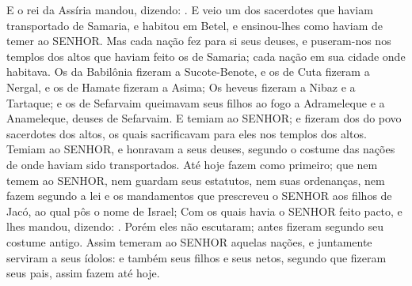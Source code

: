 {  E o rei da Assíria mandou, dizendo: .
  E veio um dos sacerdotes que haviam transportado de Samaria, e habitou em Betel, e ensinou-lhes como haviam de temer ao SENHOR.
  Mas cada nação fez para si seus deuses, e puseram-nos nos templos dos altos que haviam feito os de Samaria; cada nação em sua cidade onde habitava.
  Os da Babilônia fizeram a Sucote-Benote, e os de Cuta fizeram a Nergal, e os de Hamate fizeram a Asima;
  Os heveus fizeram a Nibaz e a Tartaque; e os de Sefarvaim queimavam seus filhos ao fogo a Adrameleque e a Anameleque, deuses de Sefarvaim.
  E temiam ao SENHOR; e fizeram dos do povo sacerdotes dos altos, os quais sacrificavam para eles nos templos dos altos.
  Temiam ao SENHOR, e honravam a seus deuses, segundo o costume das nações de onde haviam sido transportados.
  Até hoje fazem como primeiro; que nem temem ao SENHOR, nem guardam seus estatutos, nem suas ordenanças, nem fazem segundo a lei e os mandamentos que prescreveu o SENHOR aos filhos de Jacó, ao qual pôs o nome de Israel;
  Com os quais havia o SENHOR feito pacto, e lhes mandou, dizendo: .
  Porém eles não escutaram; antes fizeram segundo seu costume antigo.
  Assim temeram ao SENHOR aquelas nações, e juntamente serviram a seus ídolos: e também seus filhos e seus netos, segundo que fizeram seus pais, assim fazem até hoje.
\par }

